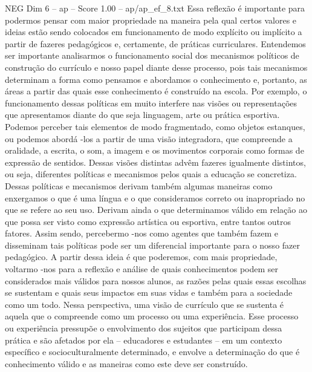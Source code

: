 \begin{textsample}{NEG Dim 6 – ap – Score 1.00 – ap/ap\_ef\_8.txt}
Essa reflexão é importante para podermos pensar com maior propriedade na maneira pela qual certos valores e ideias estão sendo colocados em funcionamento de modo explícito ou implícito a partir de fazeres pedagógicos e, certamente, de práticas curriculares.
Entendemos ser importante analisarmos o funcionamento social dos mecanismos políticos de construção do currículo e nosso papel diante desse processo, pois tais mecanismos determinam a forma como pensamos e abordamos o conhecimento e, portanto, as áreas a partir das quais esse conhecimento é construído na escola.
Por exemplo, o funcionamento dessas políticas em muito interfere nas visões ou representações que apresentamos diante do que seja linguagem, arte ou prática esportiva.
Podemos perceber tais elementos de modo fragmentado, como objetos estanques, ou podemos abordá -los a partir de uma visão integradora, que compreende a oralidade, a escrita, o som, a imagem e os movimentos corporais como formas de expressão de sentidos.
Dessas visões distintas advêm fazeres igualmente distintos, ou seja, diferentes políticas e mecanismos pelos quais a educação se concretiza.
Dessas políticas e mecanismos derivam também algumas maneiras como enxergamos o que é uma língua e o que consideramos correto ou inapropriado no que se refere ao seu uso.
Derivam ainda o que determinamos válido em relação ao que possa ser visto como expressão artística ou esportiva, entre tantos outros fatores.
Assim sendo, percebermo -nos como agentes que também fazem e disseminam tais políticas pode ser um diferencial importante para o nosso fazer pedagógico.
A partir dessa ideia é que poderemos, com mais propriedade, voltarmo -nos para a reflexão e análise de quais conhecimentos podem ser considerados mais válidos para nossos alunos, as razões pelas quais essas escolhas se sustentam e quais seus impactos em suas vidas e também para a sociedade como um todo.
Nessa perspectiva, uma visão de currículo que se sustenta é aquela que o compreende como um processo ou uma experiência.
Esse processo ou experiência pressupõe o envolvimento dos sujeitos que participam dessa prática e são afetados por ela – educadores e estudantes – em um contexto específico e socioculturalmente determinado, e envolve a determinação do que é conhecimento válido e as maneiras como este deve ser construído.

\end{textsample}
